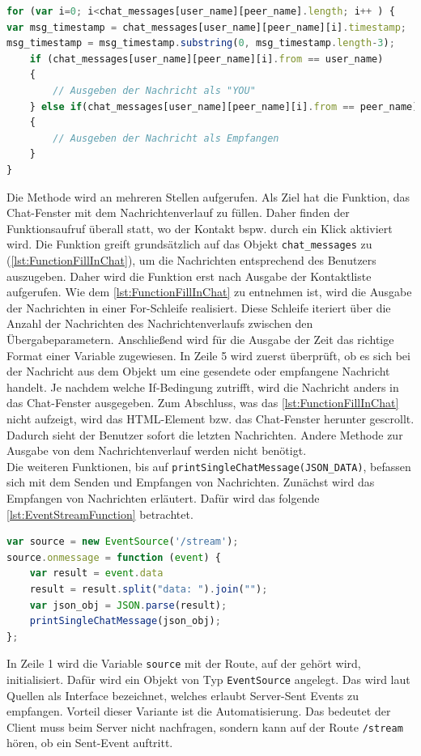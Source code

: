 \documentclass[a4paper,titlepage,halfparskip,12pt]{scrreprt}
\begin{document}
\begin{onehalfspacing}
\begin{lstlisting}[language=Javascript,caption=Füllen des Chatfensters entsprechnd des \texttt{chat\_messages-Objektes}, label={lst:FunctionFillInChat}]
for (var i=0; i<chat_messages[user_name][peer_name].length; i++ ) {
var msg_timestamp = chat_messages[user_name][peer_name][i].timestamp;
msg_timestamp = msg_timestamp.substring(0, msg_timestamp.length-3);
	if (chat_messages[user_name][peer_name][i].from == user_name)
	{
		// Ausgeben der Nachricht als "YOU"	
	} else if(chat_messages[user_name][peer_name][i].from == peer_name)
	{	
		// Ausgeben der Nachricht als Empfangen
	}
}
\end{lstlisting}
Die Methode wird an mehreren Stellen aufgerufen. Als Ziel hat die Funktion, das Chat-Fenster mit dem Nachrichtenverlauf zu füllen. Daher finden der Funktionsaufruf überall statt, wo der Kontakt bspw. durch ein Klick aktiviert wird. Die Funktion greift grundsätzlich auf das Objekt \texttt{chat\_messages} zu (\autoref{lst:FunctionFillInChat}), um die Nachrichten entsprechend des Benutzers auszugeben. Daher wird die Funktion erst nach Ausgabe der Kontaktliste aufgerufen. Wie dem \autoref{lst:FunctionFillInChat} zu entnehmen ist, wird die Ausgabe der Nachrichten in einer For-Schleife realisiert. Diese Schleife iteriert über die Anzahl der Nachrichten des Nachrichtenverlaufs zwischen den Übergabeparametern. Anschließend wird für die Ausgabe der Zeit das richtige Format einer Variable zugewiesen. In Zeile 5 wird zuerst überprüft, ob es sich bei der Nachricht aus dem Objekt um eine gesendete oder empfangene Nachricht handelt. Je nachdem welche If-Bedingung zutrifft, wird die Nachricht anders in das Chat-Fenster ausgegeben. Zum Abschluss, was das \autoref{lst:FunctionFillInChat} nicht aufzeigt, wird das \ac{HTML}-Element bzw. das Chat-Fenster herunter gescrollt. Dadurch sieht der Benutzer sofort die letzten Nachrichten. Andere Methode zur Ausgabe von dem Nachrichtenverlauf werden nicht benötigt.\\
Die weiteren Funktionen, bis auf \texttt{printSingleChatMessage(JSON\_DATA)}, befassen sich mit dem Senden und Empfangen von Nachrichten. Zunächst wird das Empfangen von Nachrichten erläutert. Dafür wird das folgende \autoref{lst:EventStreamFunction} betrachtet.
\begin{lstlisting}[language=Javascript,caption=Öffnen des Eventstreams um Nachrichten zu empfangen ,label={lst:EventStreamFunction}]
var source = new EventSource('/stream');
source.onmessage = function (event) {
	var result = event.data
	result = result.split("data: ").join("");
	var json_obj = JSON.parse(result);
	printSingleChatMessage(json_obj);
};
\end{lstlisting}
In Zeile 1 wird die Variable \texttt{source} mit der Route, auf der gehört wird, initialisiert. Dafür wird ein Objekt von Typ \texttt{EventSource} angelegt. Das wird laut Quellen als Interface bezeichnet, welches erlaubt Server-Sent Events zu empfangen. Vorteil dieser Variante ist die Automatisierung. Das bedeutet der Client muss beim Server nicht nachfragen, sondern kann auf der Route \texttt{/stream} hören, ob ein Sent-Event auftritt.\cite{w3schoolsServerSentEvent}\\

\end{onehalfspacing}
\end{document}
